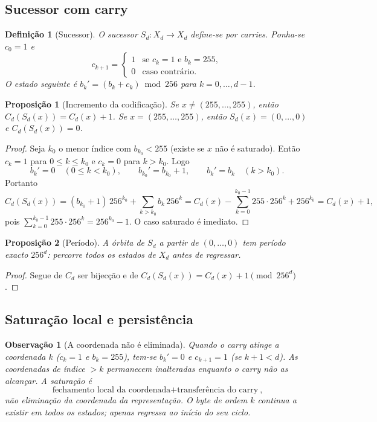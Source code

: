 \documentclass[11pt,a4paper]{article}
\newtheorem{definicao}{Definição}
\newtheorem{proposicao}{Proposição}
\newtheorem{observacao}{Observação}
\begin{document}
\subsection{Sucessor com carry}

\begin{definicao}[Sucessor]
\label{def:Sd}
O sucessor \(S_d:X_d\to X_d\) define-se por carries. Ponha-se \(c_0=1\) e
\[
c_{k+1}
=
\begin{cases}
1 & \text{se }c_k=1\text{ e }b_k=255,\\
0 & \text{caso contrário.}
\end{cases}
\]
O estado seguinte é \(b_k'=(b_k+c_k)\bmod 256\) para \(k=0,\dots,d-1\).
\end{definicao}

\begin{proposicao}[Incremento da codificação]
\label{prop:Cd-Sd}
Se \(x\neq(255,\dots,255)\), então \(C_d(S_d(x))=C_d(x)+1\).
Se \(x=(255,\dots,255)\), então \(S_d(x)=(0,\dots,0)\) e \(C_d(S_d(x))=0\).
\end{proposicao}

\begin{proof}
Seja \(k_0\) o menor índice com \(b_{k_0}<255\) (existe se \(x\) não é saturado). Então \(c_k=1\) para \(0\le k\le k_0\) e \(c_k=0\) para \(k>k_0\). Logo
\[
b_k'=0\quad(0\le k<k_0),\qquad
b_{k_0}'=b_{k_0}+1,\qquad
b_k'=b_k\quad(k>k_0).
\]
Portanto
\[
C_d(S_d(x))
=
(b_{k_0}+1)\,256^{k_0}+\sum_{k>k_0}b_k\,256^k
=
C_d(x)-\sum_{k=0}^{k_0-1}255\cdot 256^k+256^{k_0}
=
C_d(x)+1,
\]
pois \(\sum_{k=0}^{k_0-1}255\cdot 256^k=256^{k_0}-1\). O caso saturado é imediato.
\end{proof}

\begin{proposicao}[Período]
\label{prop:periodo-Sd}
A órbita de \(S_d\) a partir de \((0,\dots,0)\) tem período exacto \(256^d\): percorre todos os estados de \(X_d\) antes de regressar.
\end{proposicao}

\begin{proof}
Segue de \(C_d\) ser bijecção e de \(C_d(S_d(x))=C_d(x)+1\pmod{256^d}\).
\end{proof}

\subsection{Saturação local e persistência}

\begin{observacao}[A coordenada não é eliminada]
\label{obs:saturacao}
Quando o carry atinge a coordenada \(k\) (\(c_k=1\) e \(b_k=255\)), tem-se \(b_k'=0\) e \(c_{k+1}=1\) (se \(k+1<d\)). As coordenadas de índice \(>k\) permanecem inalteradas enquanto o carry não as alcançar. A saturação é
\[
\boxed{\text{fechamento local da coordenada}+\text{transferência do carry}},
\]
não eliminação da coordenada da representação. O byte de ordem \(k\) continua a existir em todos os estados; apenas regressa ao início do seu ciclo.
\end{observacao}
\end{document}
